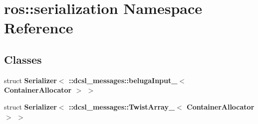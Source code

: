 \section{ros\-:\-:serialization \-Namespace \-Reference}
\label{namespaceros_1_1serialization}
\subsection*{\-Classes}
\begin{DoxyCompactItemize}
\item 
struct {\bf \-Serializer$<$ \-::dcsl\-\_\-messages\-::beluga\-Input\-\_\-$<$ Container\-Allocator $>$ $>$}
\item 
struct {\bf \-Serializer$<$ \-::dcsl\-\_\-messages\-::\-Twist\-Array\-\_\-$<$ Container\-Allocator $>$ $>$}
\end{DoxyCompactItemize}
